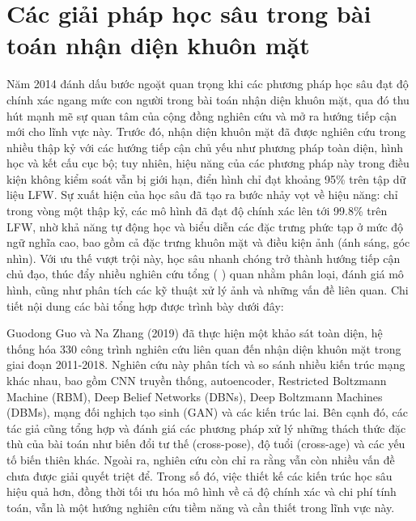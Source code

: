 \section{Các giải pháp học sâu trong bài toán nhận diện khuôn mặt}

Năm 2014 đánh dấu bước ngoặt quan trọng khi các phương pháp học sâu đạt độ chính xác ngang mức con người trong bài toán nhận diện khuôn mặt, qua đó thu hút mạnh mẽ sự quan tâm của cộng đồng nghiên cứu và mở ra hướng tiếp cận mới cho lĩnh vực này. Trước đó, nhận diện khuôn mặt đã được nghiên cứu trong nhiều thập kỷ với các hướng tiếp cận chủ yếu như phương pháp toàn diện, hình học và kết cấu cục bộ; tuy nhiên, hiệu năng của các phương pháp này trong điều kiện không kiểm soát vẫn bị giới hạn, điển hình chỉ đạt khoảng 95\% trên tập dữ liệu LFW\cite{2_electronics9081188,20_WANG2021215}. Sự xuất hiện của học sâu đã tạo ra bước nhảy vọt về hiệu năng: chỉ trong vòng một thập kỷ, các mô hình đã đạt độ chính xác lên tới 99.8\% trên LFW, nhờ khả năng tự động học và biểu diễn các đặc trưng phức tạp ở mức độ ngữ nghĩa cao, bao gồm cả đặc trưng khuôn mặt và điều kiện ảnh (ánh sáng, góc nhìn)\cite{21_otoole_2021_face}. Với ưu thế vượt trội này, học sâu nhanh chóng trở thành hướng tiếp cận chủ đạo, thúc đẩy nhiều nghiên cứu tổng ( \cite{2_electronics9081188,20_WANG2021215,30_9145558,sota_5979728,sota_GUO2019102805} ) quan nhằm phân loại, đánh giá mô hình, cũng như phân tích các kỹ thuật xử lý ảnh và những vấn đề liên quan. Chi tiết nội dung các bài tổng hợp được trình bày dưới đây:

Guodong Guo và Na Zhang (2019) \cite{sota_GUO2019102805} đã thực hiện một khảo sát toàn diện, hệ thống hóa 330 công trình nghiên cứu liên quan đến nhận diện khuôn mặt trong giai đoạn 2011-2018. Nghiên cứu này phân tích và so sánh nhiều kiến trúc mạng khác nhau, bao gồm CNN truyền thống, autoencoder, Restricted Boltzmann Machine (RBM), Deep Belief Networks (DBNs), Deep Boltzmann Machines (DBMs), mạng đối nghịch tạo sinh (GAN) và các kiến trúc lai. Bên cạnh đó, các tác giả cũng tổng hợp và đánh giá các phương pháp xử lý những thách thức đặc thù của bài toán như biến đổi tư thế (cross-pose), độ tuổi (cross-age) và các yếu tố biến thiên khác. Ngoài ra, nghiên cứu còn chỉ ra rằng vẫn còn nhiều vấn đề chưa được giải quyết triệt để. Trong số đó, việc thiết kế các kiến trúc học sâu hiệu quả hơn, đồng thời tối ưu hóa mô hình về cả độ chính xác và chi phí tính toán, vẫn là một hướng nghiên cứu tiềm năng và cần thiết trong lĩnh vực này.

